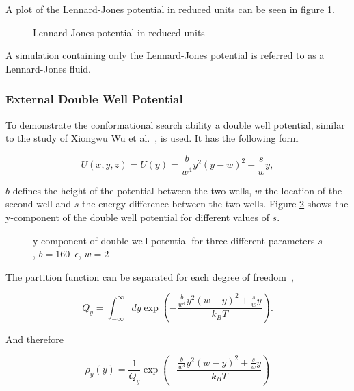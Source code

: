 \documentclass[a4paper]{article}
\begin{document}
A plot of the Lennard-Jones potential in reduced units can be seen in figure \ref{im:lennard_jones}.

\begin{figure} [H]
\centering

\caption{Lennard-Jones potential in reduced units}
\label{im:lennard_jones}
\end{figure}


A simulation containing only the Lennard-Jones potential is referred to as a Lennard-Jones fluid.

\subsubsection{External Double Well Potential}

To demonstrate the conformational search ability a double well potential, similar to the study of Xiongwu Wu et al.~\cite{XiongwuWu2011a}, is used. It has the following form

\begin{equation}
U(x,y,z) = U(y) = \frac{b}{w^4} y^2 (y - w)^2 + \frac{s}{w}y,
\label{eq:external-double-well}
\end{equation}

$b$ defines the height of the potential between the two wells, $w$ the location of the second well and $s$ the energy difference between the two wells. Figure \ref{im:double_well} shows the y-component of the double well potential for different values of $s$.

\begin{figure} [H]
\centering

\caption{y-component of double well potential for three different parameters $s$, $b = 160 \enspace \epsilon$, $w = 2$~\cite{XiongwuWu2012}}
\label{im:double_well}
\end{figure}

The partition function can be separated for each degree of freedom~\cite{XiongwuWu2012},

\begin{equation}
Q_y = \int_{- \infty}^{\infty} dy \exp \left( - \frac{\frac{b}{w^4} y^2 (w-y)^2 + \frac{s}{w} y}{k_B T} \right).
\label{eq:double-well-partition}
\end{equation}

And therefore

\begin{equation}
\rho_y (y) = \frac{1}{Q_y} \exp \left( - \frac{\frac{b}{w^4} y^2 (w-y)^2 + \frac{s}{w} y}{k_B T} \right)
\label{eq:double-well-something}
\end{equation}
\end{document}
